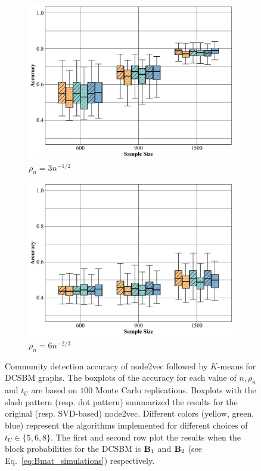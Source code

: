 \documentclass[10pt,journal,compsoc]{IEEEtran}
\newcommand{\M}[1]{{{\mathbf{\MakeUppercase{#1}}}}}
\numberwithin{equation}{section}
\begin{document}
\begin{figure}
\begin{subfigure}{.32\columnwidth}
\includegraphics[width=\columnwidth]{boxplot/db_12.pdf}%
\caption{$\rho_n = 3n^{-1/2}$}
\end{subfigure}
\begin{subfigure}{.32\columnwidth}
\includegraphics[width=\columnwidth]{boxplot/db_23.pdf}%
\caption{$\rho_n = 6n^{-2/3}$}
\label{subfig:special}
\end{subfigure}
\caption{Community detection accuracy of node2vec followed by
    $K$-means for DCSBM graphs. The
    boxplots of the accuracy for each value of $n, \rho_n$ and $
    t_U$ are based on $100$ Monte Carlo replications. Boxplots with the slash pattern (resp. dot pattern) summarized the results for the original (resp. SVD-based) node2vec. Different colors (yellow, green, blue) represent the algorithms implemented for different choices of $t_U \in \{5,6,8\}$. The first and second row
    plot the results when the block probabilities for the DCSBM is $\M B_1$ and $\M
    B_2$ (see Eq.~\eqref{eq:Bmat_simulations}) respectively.}
\label{box:2}
\end{figure}
\end{document}
